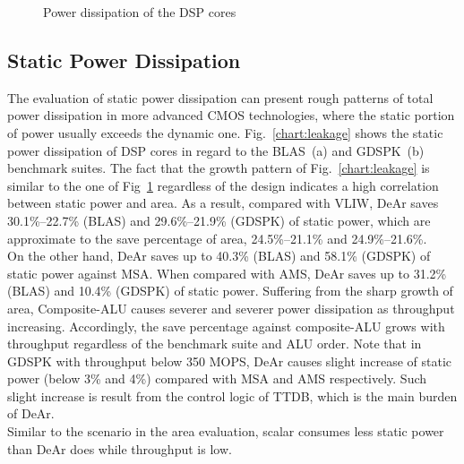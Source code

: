 {    \vspace{\textfig}
    \begin{figure}[!ht]
        \begin{center}
        \end{center}
        \caption{Power dissipation of the DSP cores}
        \label{chart:area}
    \end{figure}
    \subsection{Static Power Dissipation}
    The evaluation of static power dissipation can present rough patterns of total power dissipation in more advanced CMOS technologies, 
    where the static portion of power usually exceeds the dynamic one.
    Fig.~\ref{chart:leakage} shows the static power dissipation of DSP cores in regard to the BLAS~(a) and GDSPK~(b) benchmark suites.
    The fact that the growth pattern of Fig.~\ref{chart:leakage} is similar to the one of Fig~\ref{chart:area} regardless of the design indicates a high correlation between static power and area.
    As a result, compared with VLIW, DeAr saves 30.1\%--22.7\% (BLAS) and 29.6\%--21.9\% (GDSPK) of static power, 
    which are approximate to the save percentage of area, 24.5\%--21.1\% and 24.9\%--21.6\%.
    \\\indent 
    On the other hand, DeAr saves up to 40.3\% (BLAS) and 58.1\% (GDSPK) of static power against MSA.
    When compared with AMS, DeAr saves up to 31.2\% (BLAS) and 10.4\% (GDSPK) of static power.
    Suffering from the sharp growth of area, 
    Composite-ALU causes severer and severer power dissipation as throughput increasing.
    Accordingly, the save percentage against composite-ALU grows with throughput regardless of the benchmark suite and ALU order.
    Note that in GDSPK with throughput below 350 MOPS, 
    DeAr causes slight increase of static power (below 3\% and 4\%) compared with MSA and AMS respectively.
    Such slight increase is result from the control logic of TTDB, 
    which is the main burden of DeAr.
    \\\indent 
    Similar to the scenario in the area evaluation, 
    scalar consumes less static power than DeAr does while throughput is low.
}
